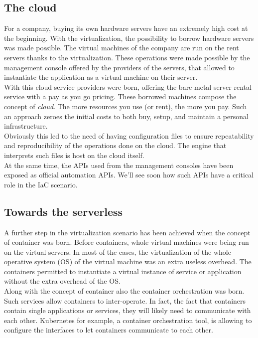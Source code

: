 \subsection{The cloud}
For a company, buying its own hardware servers have an extremely high cost at the beginning.
With the virtualization, the possibility to borrow hardware servers was made possible.
The virtual machines of the company are run on the rent servers thanks to the virtualization.
These operations were made possible by the management console offered by the providers of the servers, that allowed to instantiate the application as a virtual machine on their server.\\
With this cloud service providers were born, offering the bare-metal server rental service with a pay as you go pricing.
These borrowed machines compose the concept of \textit{cloud}.
The more resources you use (or rent), the more you pay.
Such an approach zeroes the initial costs to both buy, setup, and maintain a personal infrastructure.\\
Obviously this led to the need of having configuration files to ensure repeatability and reproducibility of the operations done on the cloud.
The engine that interprets such  files is host on the cloud itself.\\
At the same time, the APIs used from the management consoles have been exposed as official automation APIs.
We'll see soon how such APIs have a critical role in the IaC scenario.

\subsection{Towards the serverless}
A further step in the virtualization scenario has been achieved when the concept of container was born.
Before containers, whole virtual machines were being run on the virtual servers.
In most of the cases, the virtualization of the whole operative system (OS) of the virtual machine was an extra useless overhead.
The containers permitted to instantiate a virtual instance of service or application without the extra overhead of the OS.\\
Along with the concept of container also the container orchestration was born.
Such services allow containers to inter-operate.
In fact, the fact that containers contain single applications or services, they will likely need to communicate with each other.
Kubernetes for example, a container orchestration tool, is allowing to configure the interfaces to let containers communicate to each other.

